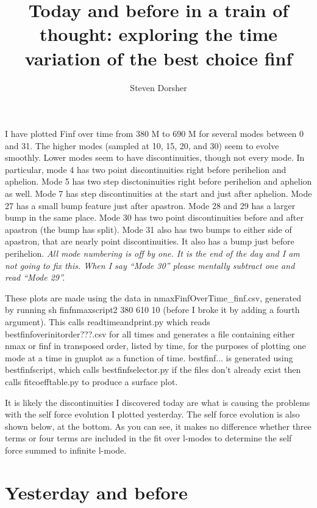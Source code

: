 \documentclass{article}
\begin{document}
\title{Today and before in a train of thought: exploring the time variation of the best choice finf}
\author{Steven Dorsher}
\maketitle


I have plotted Finf over time from 380 M to 690 M for several modes between 0 and 31. The higher modes (sampled at 10, 15, 20, and 30) seem to evolve smoothly. Lower modes seem to have discontinuities, though not every mode. In particular, mode 4 has two point discontinuities right before perihelion and aphelion. Mode 5 has two step disctoninuities right before perihelion and aphelion as well. Mode 7 has step discontinuities at the start and just after aphelion. Mode 27 has a small bump feature just after apastron. Mode 28 and 29 has a larger bump in the same place. Mode 30 has two point discontinuities before and after apastron (the bump has split). Mode 31 also has two bumps to either side of apastron, that are nearly point discontinuities. It also has a bump just before perihelion. {\em All mode numbering is off by one. It is the end of the day and I am not going to fix this. When I say ``Mode 30'' please mentally subtract one and read ``Mode 29''.}

These plots are made using the data in nmaxFinfOverTime\_finf.csv, generated by running sh finfnmaxscript2 380 610 10 (before I broke it by adding a fourth argument). This calls readtimeandprint.py which reads bestfinfoverinitorder???.csv for all times and generates a file containing either nmax or finf in transposed order, listed by time, for the purposes of plotting one mode at a time in gnuplot as a function of time. bestfinf... is generated using bestfinfscript, which calls bestfinfselector.py if the files don't already exist then calls fitcoefftable.py to produce a surface plot. 

It is likely the discontinuities I discovered today are what is causing the problems with the self force evolution I plotted yesterday. The self force evolution is also shown below, at the bottom. As you can see, it makes no difference whether three terms or four terms are included in the fit over l-modes to determine the self force summed to infinite l-mode. 

\section{Yesterday and before}
\end{document}
